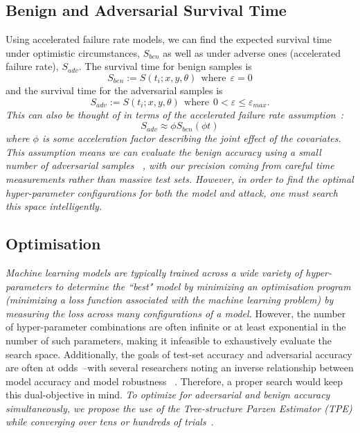 \documentclass[conference]{IEEEtran}
\newcommand{\cm}[1]{\textit{{\color{blue}#1}}}
\begin{document}
\subsection{Benign and Adversarial Survival Time}
\label{accelerated}
Using accelerated failure rate models, we can find the expected survival time under optimistic circumstances, $S_{ben}$ as well as under adverse ones (accelerated failure rate), $S_{adv}$. The survival time for benign samples is
$$
    S_{ben} := S(t_i; x, y, \theta) \mathrm{~~where~~} \varepsilon = 0
$$
and the survival time for the adversarial samples is
$$
    S_{adv} :=  S(t_i; x, y, \theta) \mathrm{~~where~~} 0 < \varepsilon \leq \varepsilon_{max}.
$$
\cm{This can also be thought of in terms of the accelerated failure rate assumption~\cite{kleinbaum1996survival}:
\begin{equation}
S_{adv} \approx  \phi S_{ben}(\phi t)
\label{assumption}
\end{equation}
where $\phi$ is some acceleration factor describing the joint effect of the covariates. This assumption means we can evaluate the benign accuracy using a small number of adversarial samples ~\cite{kleinbaum1996survival}, with our precision coming from careful time measurements rather than massive test sets.} 
\cm{However, in order to find the optimal hyper-parameter configurations for both the model and attack, one must search this space intelligently.}


\subsection{Optimisation}
\label{optimisation}
\cm{Machine learning models are typically trained across a wide variety of hyper-parameters to determine the ``best" model by minimizing an optimisation program (minimizing a loss function associated with the machine learning problem) by measuring the loss across many configurations of a model.} However, the number of hyper-parameter combinations are often infinite or at least exponential in the number of such parameters,
making it infeasible to exhaustively evaluate the search space. Additionally, the goals of test-set accuracy and adversarial accuracy are often at odds~\cite{carlini_towards_2017}--with several researchers noting an inverse relationship between model accuracy and model robustness ~\cite{carlini_towards_2017,meyers}. Therefore, a proper search would keep this dual-objective in mind.
\cm{To optimize for adversarial and benign accuracy simultaneously, we propose the use of the Tree-structure Parzen Estimator (TPE) while converging  over tens or hundreds of trials~\cite{ozaki2020multiobjective}}.
\end{document}
